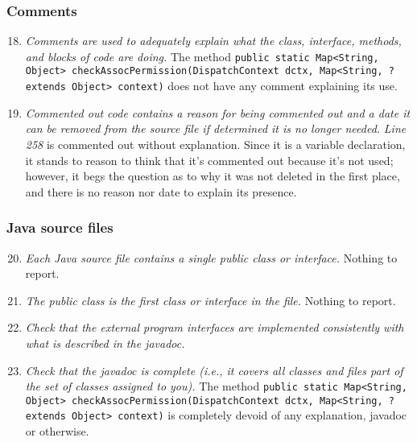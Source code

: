 	\subsubsection{Comments}
		\begin{enumerate}
			\setcounter{enumi}{17}
			\item \textit{Comments are used to adequately explain what the class, interface, methods, and blocks of code are doing.}
			The method \texttt{public static Map<String, Object> checkAssocPermission(DispatchContext dctx, Map<String, ? extends Object> context)} does not have any comment explaining its use. 

			\item \textit{Commented out code contains a reason for being commented out and a date it can be removed from the source file if determined it is no longer needed.}\newline
			\textit{Line 258} is commented out without explanation. Since it is a variable declaration, it stands to reason to think that it's commented out because it's not used; however, it begs the question as to why it was not deleted in the first place, and there is no reason nor date to explain its presence.

		\end{enumerate}

	\subsubsection{Java source files}
		\begin{enumerate}
			\setcounter{enumi}{19}
			\item \textit{Each Java source file contains a single public class or interface.}\newline
			Nothing to report. %

			\item \textit{The public class is the first class or interface in the file.}\newline
			Nothing to report. %

			\item \textit{Check that the external program interfaces are implemented consistently with what is described in the javadoc.}
	
			\item \textit{Check that the javadoc is complete (i.e., it covers all classes and files part of the set of classes assigned to you).}\newline
			The method \texttt{public static Map<String, Object> checkAssocPermission(DispatchContext dctx, Map<String, ? extends Object> context)} is completely devoid of any explanation, javadoc or otherwise. 

		\end{enumerate}

